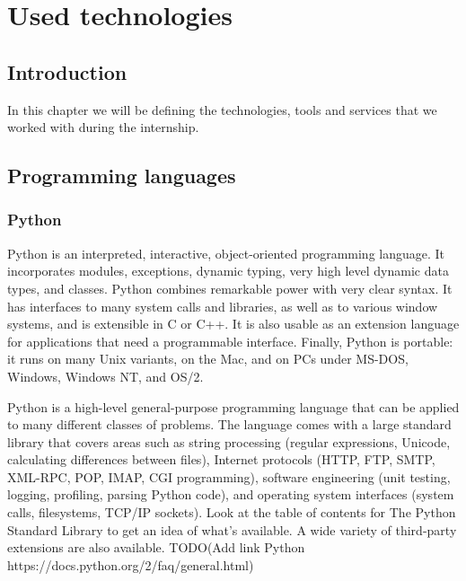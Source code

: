 \chapter{Used technologies}

\section*{Introduction}
In this chapter we will be defining the technologies, tools and services that we
worked with during the internship.


\section{Programming languages}
\subsection{Python}
Python is an interpreted, interactive, object-oriented programming language. It
incorporates modules, exceptions, dynamic typing, very high level dynamic data
types, and classes. Python combines remarkable power with very clear syntax. It
has interfaces to many system calls and libraries, as well as to various window
systems, and is extensible in C or C++. It is also usable as an extension
language for applications that need a programmable interface. Finally, Python is
portable: it runs on many Unix variants, on the Mac, and on PCs under MS-DOS,
Windows, Windows NT, and OS/2.

Python is a high-level general-purpose programming language that can be applied
to many different classes of problems. The language comes with a large standard
library that covers areas such as string processing (regular expressions,
Unicode, calculating differences between files), Internet protocols (HTTP, FTP,
SMTP, XML-RPC, POP, IMAP, CGI programming), software engineering (unit testing,
logging, profiling, parsing Python code), and operating system interfaces
(system calls, filesystems, TCP/IP sockets). Look at the table of contents for
The Python Standard Library to get an idea of what’s available. A wide variety
of third-party extensions are also available.
TODO(Add link Python https://docs.python.org/2/faq/general.html)

